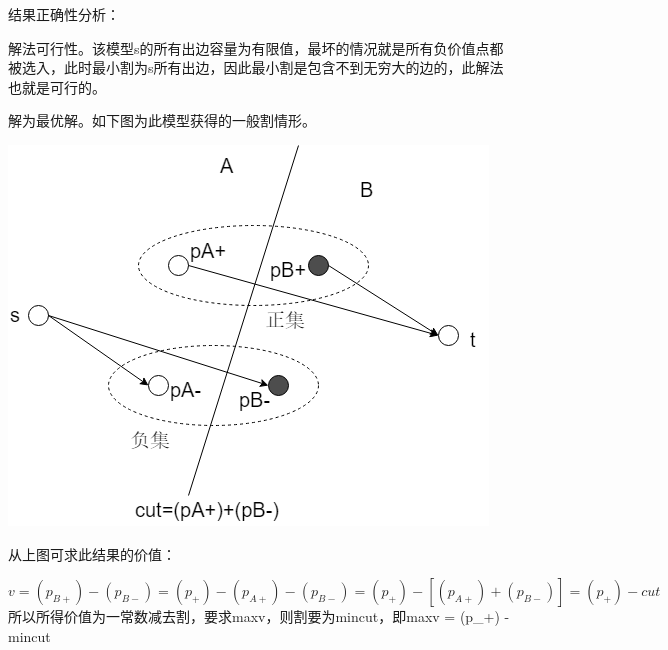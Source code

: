 结果正确性分析：

解法可行性。该模型s的所有出边容量为有限值，最坏的情况就是所有负价值点都被选入，此时最小割为s所有出边，因此最小割是包含不到无穷大的边的，此解法也就是可行的。

解为最优解。如下图为此模型获得的一般割情形。

\centerline{\includegraphics[scale=0.6]{Ln11.image/networkflow11.png}}

从上图可求此结果的价值：

\begin{equation}
v = (p_{B+}) - (p_{B-}) = (p_+) - (p_{A+}) - (p_{B-}) = (p_+) - [(p_{A+}) + (p_{B-})] = (p_+) - cut

\end{equation}
所以所得价值为一常数减去割，要求maxv，则割要为mincut，即maxv = (p_+) -mincut

